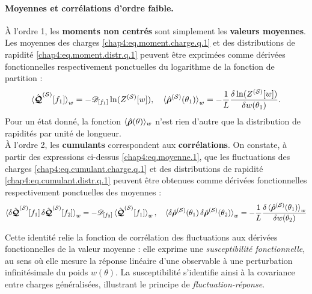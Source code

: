 \paragraph{Moyennes et corrélations d’ordre faible.}
À l’ordre 1, les {\bf moments non centrés} sont simplement les {\bf valeurs moyennes}. Les moyennes des charges \eqref{chap4:eq.moment.charge.q.1} et des distributions de rapidité \eqref{chap4:eq.moment.distr.q.1} peuvent être exprimées comme dérivées fonctionnelles respectivement ponctuelles  du logarithme de la fonction de partition :
\begin{eqnarray}\label{chap4:eq.moyenne.1}
	\braket{\hat{\bm{\mathcal{Q}}}^{(\mathcal{S})}[f_1]}_w   =  - \mathscr{D}_{[f_1]}  \ln(Z^{(\mathcal{S})}[w]), \quad \braket{\hat{\bm{\rho}}^{(\mathcal{S})}(\theta_1)}_w   =  - \frac{1}{L}\frac{\delta \ln(Z^{(\mathcal{S})}[w])}{\delta w(\theta_1)} .
\end{eqnarray}
Pour un état donné, la fonction $\langle \hat{\bm{\rho}}(\theta) \rangle_w$ n’est rien d’autre que la distribution de rapidités par unité de longueur.\\

À l’ordre 2, les {\bf cumulants}  correspondent aux {\bf corrélations}. On constate, à partir des expressions ci-dessus \eqref{chap4:eq.moyenne.1}, que les fluctuations des charges \eqref{chap4:eq.cumulant.charge.q.1} et des distributions de rapidité \eqref{chap4:eq.cumulant.distr.q.1} peuvent être obtenues comme dérivées fonctionnelles respectivement ponctuelles des moyennes :
\begin{eqnarray}\label{chap4:eq.susceptibilite-fonctionnelle}
	\braket{\delta\hat{\bm{\mathcal{Q}}}^{(\mathcal{S})}[f_1] \, \delta \hat{\bm{\mathcal{Q}}}^{(\mathcal{S})}[f_2]}_w   =  - \mathscr{D}_{[f_2]}  \braket{\hat{\bm{\mathcal{Q}}}^{(\mathcal{S})}[f_1]}_w, \quad \braket{\delta\hat{\bm{\rho}}^{(\mathcal{S})}(\theta_1)\, \delta\hat{\bm{\rho}}^{(\mathcal{S})}(\theta_2)}_w   =  - \frac{1}{L} \frac{\delta  \braket{\hat{\bm{\rho}}^{(\mathcal{S})}(\theta_1)}_w }{\delta w(\theta_2)}	
\end{eqnarray}

Cette identité relie la fonction de corrélation des fluctuations aux dérivées fonctionnelles de la valeur moyenne : elle exprime une \emph{susceptibilité fonctionnelle}, au sens où elle mesure la réponse linéaire d'une observable à une perturbation infinitésimale du poids $w(\theta)$. La susceptibilité s'identifie ainsi à la covariance entre charges généralisées, illustrant le principe de \emph{fluctuation-réponse}.

